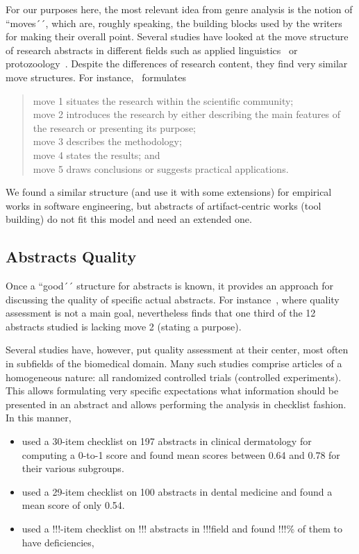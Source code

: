 \documentclass[10pt,journal,compsoc]{IEEEtran}
\begin{document}
For our purposes here, the most relevant idea from genre analysis is the notion
of ``moves´´, which are, roughly speaking, the building blocks used by the writers
for making their overall point.
Several studies have looked at the move structure of research abstracts
in different fields such as 
applied linguistics~\cite{DosSantos96} or
protozoology~\cite{CroOpp06}.
Despite the differences of research content, they find very similar move structures.
For instance,~\cite{CroOpp06} formulates
\begin{quote}
	move 1 situates the research within the scientific community;\\
	move 2 introduces the research by either describing the main features of the
    research or presenting its purpose;\\
	move 3 describes the methodology;\\
	move 4 states the results; and\\
    move 5 draws conclusions or suggests practical applications.
\end{quote}
We found a similar structure (and use it with some extensions)
for empirical works in software engineering, 
but abstracts of artifact-centric works (tool building) do not fit this model and need
an extended one.


\subsection{Abstracts Quality}

Once a ``good´´ structure for abstracts is known, it provides an approach for
discussing the quality of specific actual abstracts.
For instance~\cite{CroOpp06}, where quality assessment is not a main goal,
nevertheless finds that one third of the 12 abstracts studied
is lacking move 2 (stating a purpose).

Several studies have, however, put quality assessment at their center,
most often in subfields of the biomedical domain.
Many such studies comprise articles of a homogeneous nature:
all randomized controlled trials (controlled experiments).
This allows formulating very specific expectations what information should be
presented in an abstract and allows performing the analysis in checklist fashion.
In this manner,
\begin{itemize}
  \item \cite{DupKhoLeb03} used a 30-item checklist on 197 abstracts in clinical dermatology
     for computing a 0-to-1 score and found mean scores between 0.64 and 0.78 for their various subgroups.
  \item \cite{ShaHar06} used a 29-item checklist on 100 abstracts in dental medicine
	 and found a mean score of only 0.54.
  \item \cite{} used a !!!-item checklist on !!! abstracts in !!!field
	 and found !!!\% of them to have deficiencies,
\end{itemize}
\end{document}
